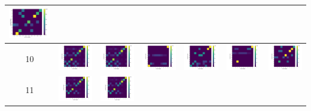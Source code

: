 \begin{tabular}{ |c|c|c|c|c|c|c| }
        \includegraphics[width=0.13\linewidth]{../results/9-clusters/accuracy - test 3 preprocessed.png} \\
    \hline
        10 & 
        \includegraphics[width=0.13\linewidth]{../results/10-clusters/accuracy - train.png} &
        \includegraphics[width=0.13\linewidth]{../results/10-clusters/accuracy - test 1.png} &
        \includegraphics[width=0.13\linewidth]{../results/10-clusters/accuracy - test 2.png} &
        \includegraphics[width=0.13\linewidth]{../results/10-clusters/accuracy - test 2 preprocessed.png} &
        \includegraphics[width=0.13\linewidth]{../results/10-clusters/accuracy - test 3.png} &
        \includegraphics[width=0.13\linewidth]{../results/10-clusters/accuracy - test 3 preprocessed.png} \\
    \hline
        11 & 
        \includegraphics[width=0.13\linewidth]{../results/11-clusters/accuracy - train.png} &
        \includegraphics[width=0.13\linewidth]{../results/11-clusters/accuracy - test 1.png} &

\end{tabular}
